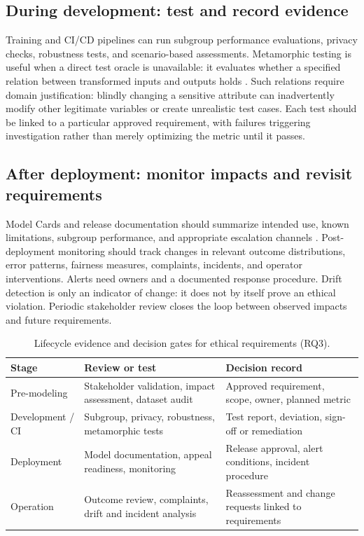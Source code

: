 \documentclass[11pt,a4paper]{article}
\begin{document}
\subsection{During development: test and record evidence}
Training and CI/CD pipelines can run subgroup performance evaluations, privacy checks, robustness tests, and scenario-based assessments. Metamorphic testing is useful when a direct test oracle is unavailable: it evaluates whether a specified relation between transformed inputs and outputs holds \cite{chen2018}. Such relations require domain justification: blindly changing a sensitive attribute can inadvertently modify other legitimate variables or create unrealistic test cases. Each test should be linked to a particular approved requirement, with failures triggering investigation rather than merely optimizing the metric until it passes.

\subsection{After deployment: monitor impacts and revisit requirements}
Model Cards and release documentation should summarize intended use, known limitations, subgroup performance, and appropriate escalation channels \cite{mitchell2019}. Post-deployment monitoring should track changes in relevant outcome distributions, error patterns, fairness measures, complaints, incidents, and operator interventions. Alerts need owners and a documented response procedure. Drift detection is only an indicator of change: it does not by itself prove an ethical violation. Periodic stakeholder review closes the loop between observed impacts and future requirements.

\begin{table}[htbp]
\centering\small
\caption{Lifecycle evidence and decision gates for ethical requirements (RQ3).}\label{tab:vv}
\begin{tabularx}{\linewidth}{p{2.4cm}X X}
\toprule
\textbf{Stage} & \textbf{Review or test} & \textbf{Decision record}\\\midrule
Pre-modeling & Stakeholder validation, impact assessment, dataset audit & Approved requirement, scope, owner, planned metric\\
Development / CI & Subgroup, privacy, robustness, metamorphic tests & Test report, deviation, sign-off or remediation\\
Deployment & Model documentation, appeal readiness, monitoring & Release approval, alert conditions, incident procedure\\
Operation & Outcome review, complaints, drift and incident analysis & Reassessment and change requests linked to requirements\\
\bottomrule
\end{tabularx}
\end{table}
\end{document}
